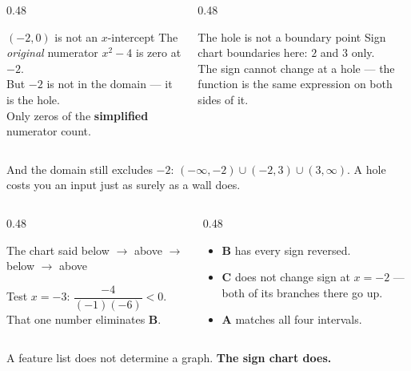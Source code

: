 \documentclass[aspectratio=169, 11pt]{beamer}
\begin{document}
\begin{frame}[t, plain]
  \begin{columns}[T]
    \begin{column}{0.48\textwidth}
      \begin{block}{$(-2,0)$ is not an $x$-intercept}
        The \emph{original} numerator $x^2-4$ is zero at $-2$. \\[3pt]
        But $-2$ is not in the domain --- it is the hole. \\[3pt]
        Only zeros of the \textbf{simplified} numerator count.
      \end{block}
    \end{column}
    \begin{column}{0.48\textwidth}
      \begin{block}{The hole is not a boundary point}
        Sign chart boundaries here: $2$ and $3$ only. \\[3pt]
        The sign cannot change at a hole --- the function is the same expression on both sides of it.
      \end{block}
    \end{column}
  \end{columns}
  \vspace{8pt}
  {\footnotesize And the domain still excludes $-2$: $(-\infty,-2)\cup(-2,3)\cup(3,\infty)$.
  A hole costs you an input just as surely as a wall does.}
\end{frame}

\begin{frame}[t, plain]
  \begin{columns}[T]
    \begin{column}{0.48\textwidth}
      \begin{block}{The chart said}
        \centering below \; $\rightarrow$ \; above \; $\rightarrow$ \; below \; $\rightarrow$ \; above
      \end{block}
      \vspace{4pt}
      {\footnotesize Test $x=-3$: $\dfrac{-4}{(-1)(-6)}<0$. That one number eliminates \textbf{B}.}
    \end{column}
    \begin{column}{0.48\textwidth}
      \begin{itemize}\setlength{\itemsep}{4pt}
        \item \textbf{B} has every sign reversed.
        \item \textbf{C} does not change sign at $x=-2$ --- both of its branches there go up.
        \item \textbf{A} matches all four intervals.
      \end{itemize}
    \end{column}
  \end{columns}
  \vspace{6pt}
  \begin{block}{}
    \centering A feature list does not determine a graph. \textbf{The sign chart does.}
  \end{block}
\end{frame}
\end{document}
